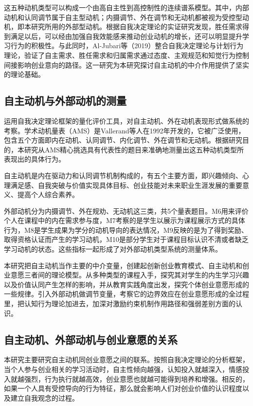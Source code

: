 这五种动机类型可以构成一个由高自主性到高控制性的连续谱系模型。其中，内部动机和认同调节属于自主型动机；内摄调节、外在调节和无动机都被视为受控型动机，即本研究所用的外部型动机。根据自我决定理论的实证研究发现，胜任需求得到满足以后，可以经由加强自我效能感来推动创业动机的增长，还可以明显提升学习行为的积极性。与此同时，Al-Jubari等\nolinebreak[3]（2019）整合自我决定理论与计划行为理论，验证了自主需求、胜任需求和归属需求通过态度、主观规范和知觉行为控制间接影响创业意向的路径\cite{AlJubari2019}。这一研究为本研究探讨自主动机的中介作用提供了坚实的理论基础。

\subsection{自主动机与外部动机的测量}

运用自我决定理论框架的量化评价工具，对自主动机、外在动机表现形式做系统的考察。学术动机量表\nolinebreak[3]（AMS）是Vallerand等人在1992年开发的，它被广泛使用，包含五个方面即内在动机、认同调节、内化调节、外在调节和无动机\cite{Vallerand1992}。根据研究目的，本研究从AMS精心挑选具有代表性的题目来准确地测量出这五种动机类型所表现出的具体行为。

自主动机是内在驱动力和认同调节机制构成的，有五个主要方面，即兴趣倾向、心理满足感、自我突破与价值实现具体目标、创业技能对未来职业生涯发展的重要意义、提高个人综合素养。

外部动机分为内摄调节、外在规劝、无动机这三类，共5个量表题目。M6用来评价个人在课程中的内在需求参与度，M7考察的是学生以展示为课程展示方式的具体行为，M8是学生成果为学分的动机导向的表达情况，M9反映的是为了得到奖励、取得资格认证而产生的学习动机，M10是部分学生对于课程目标认识不清或者缺乏学习动机的状态。这些指标一起形成了对外部动机类型系统的测量体系。

本研究把自主动机当作主要的中介变量，创建起创新创业教育模式、自主动机和创业意愿三者间的理论模型。从多种类型的课程入手，探究其对学生的内生学习兴趣以及价值认同产生怎样的影响，并从教育实践角度出发，探究个体创业意愿形成的一些规律。引入外部动机做调节变量，考察它的边界效应在创业意愿形成的全过程里，把认知行为理论加进去，加深对激励约束机制作用路径和强弱差别方面的认识。

\subsection{自主动机、外部动机与创业意愿的关系}

本研究主要研究自主动机同创业意愿之间的联系。按照自我决定理论的分析框架，当个人参与创业相关的学习活动时，自主性倾向越强，认知投入就越深入，情感投入就越强烈，行为执行就越高效，创业意愿也就越可能得到培养和增强。相反的，如果一个人具有受控导向的行为特征，那么就会影响人们对创业价值的认识程度以及建立自我观念的过程。

